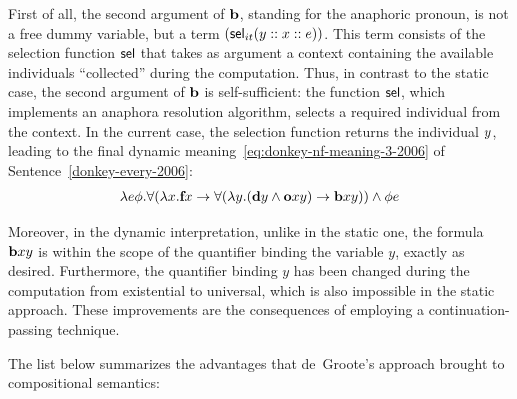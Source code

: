 
First of all, the second argument of $\textbf{b}$, standing for the anaphoric pronoun, is not a free dummy variable, but a term $( \selK_{it} (\y1 :: \x1 :: e))$. This term consists of the selection function $\mathsf{sel}$ that takes as argument a context containing the available individuals ``collected'' during the computation. Thus, in contrast to the static case, the second argument of $\textbf{b}$ is self-sufficient: the function $\mathsf{sel}$, which implements an anaphora resolution algorithm, selects a required individual from the context. In the current case, the selection function returns the individual $\y1$, leading to the final dynamic meaning~\eqref{eq:donkey-nf-meaning-3-2006} of Sentence~\eqref{donkey-every-2006}:
\begin{align}
\lambda e \phi. \forall ( \lambda \x1.  \cfarmer \x1  \rightarrow    \forall ( \lambda \y1.  ( \cdonkey \y1 \land  \cown \x1 \y1 ) \rightarrow   \cbeat \x1 \y1  ) )  \land \phi e  \label{eq:donkey-nf-meaning-3-2006}
\end{align}

Moreover, in the dynamic interpretation, unlike in the static one, the formula $\cbeat \x1 \y1 $ is within the scope of the quantifier binding the variable $y$, exactly as desired.  Furthermore, the quantifier binding $y$ has been changed during the computation from existential to universal, which is also impossible in the static approach. These improvements are the consequences of employing a continuation-passing technique. 

The list below summarizes the advantages that de~Groote's approach brought to compositional semantics:

